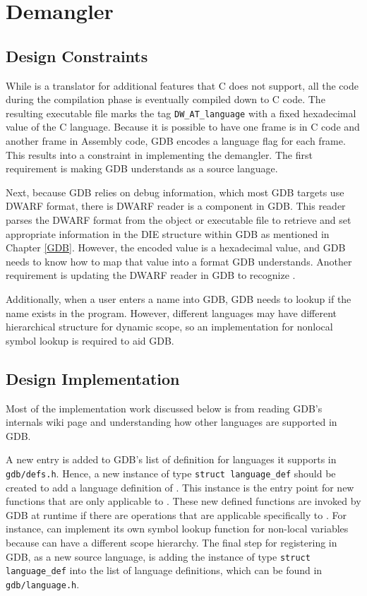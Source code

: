 \chapter{\CFAS Demangler} \label{demangler}

\section{Design Constraints}
While \CFAS is a translator for additional features that C does not support, all
the code during the compilation phase is eventually compiled down to C code.
The resulting executable file marks the tag \verb|DW_AT_language| with a
fixed hexadecimal value of the C language. Because it is possible to have one frame is in C code and another
frame in Assembly code, GDB encodes a language flag for each frame. This
results into a constraint in implementing the demangler. The first requirement is
making GDB understands \CFAS as a source language.

Next, because GDB relies on debug information, which most GDB targets use DWARF
format, there is DWARF reader is a component in GDB. This reader parses the DWARF format from the object or
executable file to retrieve and set
appropriate information in the DIE structure within GDB as mentioned in Chapter
\ref{GDB}. However, the encoded value is a hexadecimal value, and GDB needs to
know how to map that value into a format GDB understands.
Another requirement is updating the DWARF reader in GDB to recognize \CFA.

Additionally, when a user enters a name into GDB, GDB needs to lookup if the
name exists in the program. However, different languages may have different
hierarchical structure for dynamic scope, so an implementation for nonlocal
symbol lookup is required to aid GDB.

\section{Design Implementation}
Most of the implementation work discussed below is from reading GDB's internals
wiki page and understanding how other languages are supported in GDB\cite{reference5}.

A new entry is added to GDB's list of definition for languages it supports in
\verb|gdb/defs.h|. Hence, a new instance of type \verb|struct language_def|
should be created to add a language definition of \CFAS. This instance is the
entry point for new functions that are only applicable to \CFA. These new
defined functions are invoked by GDB at runtime if there are operations that
are applicable specifically to \CFA. For instance, \CFAS can implement its
own symbol lookup function for non-local variables because \CFAS can have a
different scope hierarchy. The final step for registering \CFAS in GDB, as a new
source language, is adding the instance of type \verb|struct language_def| into
the list of language definitions, which can be found in
\verb|gdb/language.h|.

